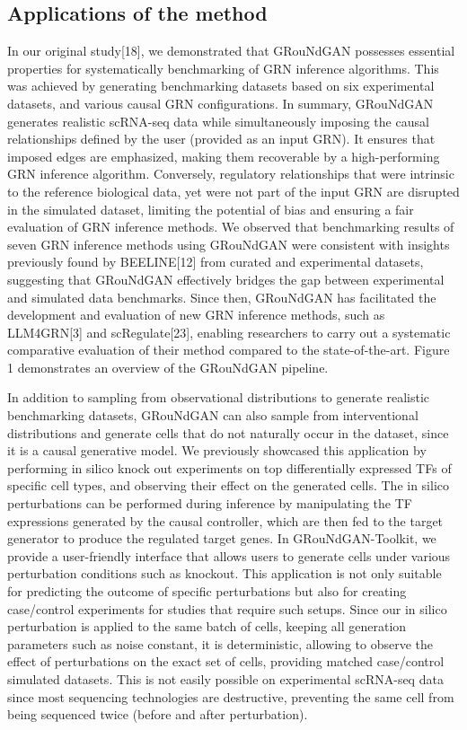 \subsection*{Applications of the method}

In our original study[18], we demonstrated that GRouNdGAN possesses essential properties for
systematically benchmarking of GRN inference algorithms. This was achieved by generating
benchmarking datasets based on six experimental datasets, and various causal GRN
configurations. In summary, GRouNdGAN generates realistic scRNA-seq data while
simultaneously imposing the causal relationships defined by the user (provided as an input GRN).
It ensures that imposed edges are emphasized, making them recoverable by a high-performing
GRN inference algorithm. Conversely, regulatory relationships that were intrinsic to the
reference biological data, yet were not part of the input GRN are disrupted in the simulated
dataset, limiting the potential of bias and ensuring a fair evaluation of GRN inference methods.
We observed that benchmarking results of seven GRN inference methods using GRouNdGAN
were consistent with insights previously found by BEELINE[12] from curated and experimental
datasets, suggesting that GRouNdGAN effectively bridges the gap between experimental and
simulated data benchmarks. Since then, GRouNdGAN has facilitated the development and
evaluation of new GRN inference methods, such as LLM4GRN[3] and scRegulate[23], enabling
researchers to carry out a systematic comparative evaluation of their method compared to the
state-of-the-art. Figure 1 demonstrates an overview of the GRouNdGAN pipeline. 

In addition to sampling from observational distributions to generate realistic benchmarking
datasets, GRouNdGAN can also sample from interventional distributions and generate cells that
do not naturally occur in the dataset, since it is a causal generative model. We previously
showcased this application by performing in silico knock out experiments on top differentially
expressed TFs of specific cell types, and observing their effect on the generated cells. The in silico
perturbations can be performed during inference by manipulating the TF expressions generated
by the causal controller, which are then fed to the target generator to produce the regulated
target genes. In GRouNdGAN-Toolkit, we provide a user-friendly interface that allows users to
generate cells under various perturbation conditions such as knockout. This application is not
only suitable for predicting the outcome of specific perturbations but also for creating
case/control experiments for studies that require such setups. Since our in silico perturbation is
applied to the same batch of cells, keeping all generation parameters such as noise constant, it
is deterministic, allowing to observe the effect of perturbations on the exact set of cells, providing
matched case/control simulated datasets. This is not easily possible on experimental scRNA-seq
data since most sequencing technologies are destructive, preventing the same cell from being
sequenced twice (before and after perturbation). 

